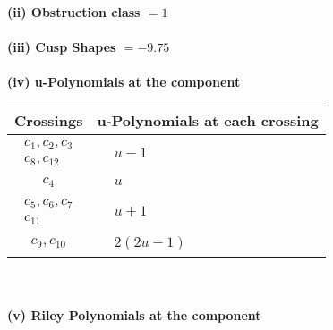 \documentclass[1p]{elsarticle_modified}
\theoremstyle{definition}
\begin{document}
\flushleft \textbf{(ii) Obstruction class $= 1$}\\~\\
\flushleft \textbf{(iii) Cusp Shapes $= -9.75$}\\~\\
\newpage\renewcommand{\arraystretch}{1}
\flushleft \textbf{(iv) u-Polynomials at the component}\newline \\
\begin{tabular}{m{50pt}|m{274pt}}
Crossings & \hspace{64pt}u-Polynomials at each crossing \\
\hline $$\begin{aligned}c_{1},c_{2},c_{3}\\c_{8},c_{12}\end{aligned}$$&$\begin{aligned}
&u-1
\end{aligned}$\\
\hline $$\begin{aligned}c_{4}\end{aligned}$$&$\begin{aligned}
&u
\end{aligned}$\\
\hline $$\begin{aligned}c_{5},c_{6},c_{7}\\c_{11}\end{aligned}$$&$\begin{aligned}
&u+1
\end{aligned}$\\
\hline $$\begin{aligned}c_{9},c_{10}\end{aligned}$$&$\begin{aligned}
&2(2 u-1)
\end{aligned}$\\
\hline
\end{tabular}\\~\\
\newpage\renewcommand{\arraystretch}{1}
\flushleft \textbf{(v) Riley Polynomials at the component}\newline \\
\end{document}
